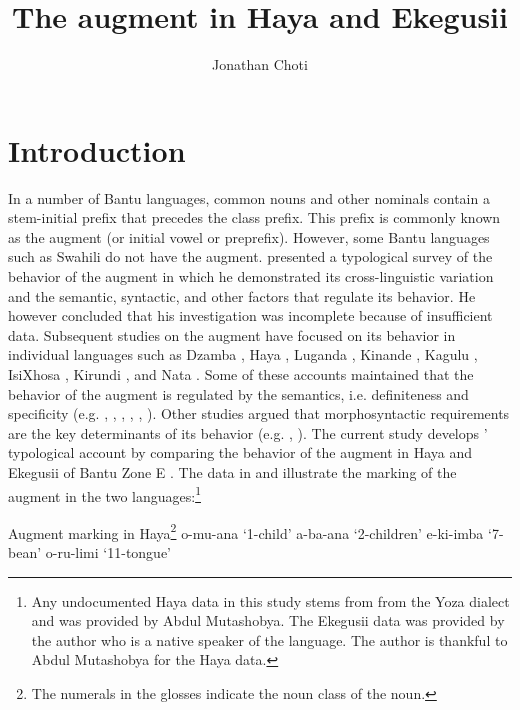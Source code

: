 \documentclass[output=paper]{langscibook}
\author{Jonathan Choti\affiliation{Michigan State University}}
\title{The augment in Haya and Ekegusii}
\begin{document}
\maketitle

\section{Introduction}
In a number of Bantu languages, common nouns and other nominals contain a stem-initial prefix that precedes the class prefix. This prefix is commonly known as the augment (or initial vowel or preprefix). However, some Bantu languages such as Swahili do not have the augment.  presented a typological survey of the behavior of the augment in which he demonstrated its cross-linguistic variation and the semantic, syntactic, and other factors that regulate its behavior. He however concluded that his investigation was incomplete because of insufficient data. Subsequent studies on the augment have focused on its behavior in individual languages such as Dzamba \citep{bokamba1971specificity}, Haya \citep{chagas1977}, Luganda  \citep{ashton1987luganda,hyman1993augment,ferrari2009,mould1974syntax}, Kinande \citep{progovac1993non}, Kagulu \citep{petzell2003function}, IsiXhosa \citep{visser2008definiteness}, Kirundi \citep{ndayiragije2012augment}, and Nata \citep{gambarage2013pre,gambarage2019belief}. Some of these accounts maintained that the behavior of the augment is regulated by the semantics, i.e. definiteness and specificity (e.g. \citealt{bleek1869comparative}, \citealt{bokamba1971specificity}, \citealt{gambarage2013pre,gambarage2019belief}, \citealt{givon1972studies}, \citealt{meeussen1959essai}, \citealt{mould1974syntax}). Other studies argued that morphosyntactic requirements are the key determinants of its behavior (e.g. \citealt{dewees1971role}, \citealt{hyman1993augment}). The current study develops \citeauthor{blois1970augment}’ typological account by comparing the behavior of the augment in Haya and Ekegusii of Bantu Zone E \citep{guthrie196771}. The data in  and  illustrate the marking of the augment in the two languages:\footnote{Any undocumented Haya data in this study stems from from the Yoza dialect and was provided by Abdul Mutashobya. The Ekegusii data was provided by the author who is a native speaker of the language. The author is thankful to Abdul Mutashobya for the Haya data.}\largerpage

\ea
 Augment marking in Haya\footnote{The numerals in the glosses indicate the noun class of the noun.} \label{hayagusii1}
    \ea\label{hayagusii1a} o-mu-ana\hphantom{`}  	‘1-child’
    \ex\label{hayagusii1b}   	a-ba-ana\hphantom{o`}  	‘2-children’
    \ex\label{hayagusii1c}  	e-ki-imba\hphantom{i}  	‘7-bean’
    \ex\label{hayagusii1d}  	o-ru-limi\hphantom{n}	‘11-tongue’
    \z
\z
\end{document}
